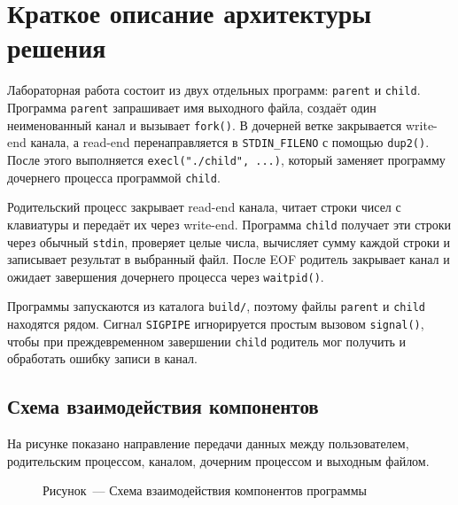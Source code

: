 \documentclass[12pt,a4paper]{article}
\begin{document}
\section{Краткое описание архитектуры решения}

Лабораторная работа состоит из двух отдельных программ: \texttt{parent} и \texttt{child}. Программа \texttt{parent} запрашивает имя выходного файла, создаёт один неименованный канал и вызывает \texttt{fork()}. В дочерней ветке закрывается write-end канала, а read-end перенаправляется в \texttt{STDIN\_FILENO} с помощью \texttt{dup2()}. После этого выполняется \texttt{execl("./child", ...)}, который заменяет программу дочернего процесса программой \texttt{child}.

Родительский процесс закрывает read-end канала, читает строки чисел с клавиатуры и передаёт их через write-end. Программа \texttt{child} получает эти строки через обычный \texttt{stdin}, проверяет целые числа, вычисляет сумму каждой строки и записывает результат в выбранный файл. После EOF родитель закрывает канал и ожидает завершения дочернего процесса через \texttt{waitpid()}.

Программы запускаются из каталога \texttt{build/}, поэтому файлы \texttt{parent} и \texttt{child} находятся рядом. Сигнал \texttt{SIGPIPE} игнорируется простым вызовом \texttt{signal()}, чтобы при преждевременном завершении \texttt{child} родитель мог получить и обработать ошибку записи в канал.

\subsection{Схема взаимодействия компонентов}

На рисунке показано направление передачи данных между пользователем, родительским процессом, каналом, дочерним процессом и выходным файлом.

\begin{figure}[H]
\centering
{}
\caption*{Рисунок~--- Схема взаимодействия компонентов программы}
\end{figure}
\end{document}

